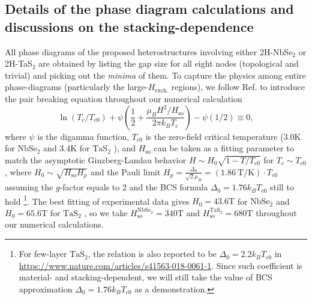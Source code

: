 \begin{subappendices}
	\section{Details of the phase diagram calculations and discussions on the  stacking-dependence}\label{app:phase_diagram_details}
	All phase diagrams of the proposed heterostructures involving either 2H-NbSe$_2$ or 2H-TaS$_2$ are obtained by listing the gap size for all eight nodes (topological and trivial) and picking out the \emph{minima} of them. To capture the physics among entire phase-diagrams (particularly the large-$H_\text{exch.}$ regions), we follow Ref.\cite{xi2016ising} to introduce the pair breaking equation throughout our numerical calculation
	\begin{equation*}
		\ln(T_c/T_{c0})+\psi\left(\dfrac{1}{2}+\dfrac{\mu_B H^2/H_{\text{so}}}{2\pi k_B T_c}\right)-\psi(1/2)\equiv0,
	\end{equation*}
	where $\psi$ is the digamma function, $T_{c0}$ is the zero-field critical temperature ($3.0$K for $\mathrm{NbSe_2}$ \cite{xi2016ising} and $3.4$K for $\mathrm{TaS_2}$ \cite{yang2018enhanced}), and $H_{\text{so}}$ can be taken as a fitting parameter to match the asymptotic Ginzberg-Landau behavior $H\sim H_0\sqrt{1-T/T_{c0}}$ for $T_c\sim T_{c0}$, where $H_0\sim\sqrt{H_{\text{so}}H_p}$ and the Pauli limit  $H_p=\frac{\Delta_0}{\sqrt{2}\mu_B}=(1.86~\mathrm{T/K})\cdot T_{c0}$ assuming the $g$-factor equals to 2 and the BCS formula $\Delta_0=1.76k_B T_{c0}$ still to hold \footnote{For few-layer $\mathrm{TaS_2}$, the relation is also reported to be $\Delta_0=2.2k_B T_{c0}$ in \protect\url{https://www.nature.com/articles/s41563-018-0061-1}. Since such coefficient is material- and stacking-dependent, we will still take the value of BCS approximation $\Delta_0=1.76k_B T_{c0}$ as a demonstration.}. The best fitting of experimental data gives $H_0=43.6\mathrm{T}$ for $\mathrm{NbSe_2}$ and $H_0=65.6\mathrm{T}$ for $\mathrm{TaS_2}$ \cite{de2018tuning}, so we take $H_{\text{so}}^{\mathrm{NbSe_2}}=340\mathrm{T}$ and $H_{\text{so}}^{\mathrm{TaS_2}}=680\mathrm{T}$ throughout our numerical calculations.\par

\end{subappendices}
